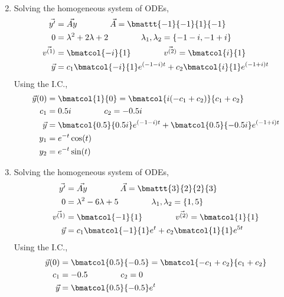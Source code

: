 \begin{enumerate}
\begin{align}
\end{align}
\item Solving the homogeneous system of ODEs,
\begin{align}
    \vec{y'}      & = \vec{Ay}
    \qquad\qquad
    \vec{A}                           = \bmattt{-1}{-1}{1}{-1}      \\
    0             & = \lambda^{2} + 2\lambda + 2
    \qquad\qquad
    \lambda_1, \lambda_2              = \left\{ -1-i, -1+i \right\} \\
    \vec{v^{(1)}} & = \bmatcol{-i}{1}
    \qquad\qquad
    \vec{v^{(2)}} = \bmatcol{i}{1}                                  \\
    \vec{y}       & = c_1 \bmatcol{-i}{1}e^{(-1-i)t}
    + c_2\bmatcol{i}{1}e^{(-1+i)t}
\end{align}
Using the I.C.,
\begin{align}
    \vec{y}(0) & = \bmatcol{1}{0} = \bmatcol{i(-c_1 + c_2)}{c_1 + c_2} \\
    c_1        & = 0.5i \qquad\qquad c_2 = -0.5i                       \\
    \vec{y}    & = \bmatcol{0.5}{0.5i}e^{(-1-i)t}
    + \bmatcol{0.5}{-0.5i}e^{(-1+i)t}                                  \\
    y_1        & = e^{-t}\cos(t)                                       \\
    y_2        & = e^{-t}\sin(t)
\end{align}
\item Solving the homogeneous system of ODEs,
\begin{align}
    \vec{y'}      & = \vec{Ay}
    \qquad\qquad
    \vec{A}                           = \bmattt{3}{2}{2}{3}   \\
    0             & = \lambda^{2} - 6\lambda + 5
    \qquad\qquad
    \lambda_1, \lambda_2              = \left\{ 1, 5 \right\} \\
    \vec{v^{(1)}} & = \bmatcol{-1}{1}
    \qquad\qquad
    \vec{v^{(2)}} = \bmatcol{1}{1}                            \\
    \vec{y}       & = c_1 \bmatcol{-1}{1}e^{t}
    + c_2\bmatcol{1}{1}e^{5t}
\end{align}
Using the I.C.,
\begin{align}
    \vec{y}(0) & = \bmatcol{0.5}{-0.5} = \bmatcol{-c_1 + c_2}{c_1 + c_2} \\
    c_1        & = -0.5 \qquad\qquad c_2 = 0                             \\
    \vec{y}    & = \bmatcol{0.5}{-0.5}e^{t}
\end{align}

\end{enumerate}
